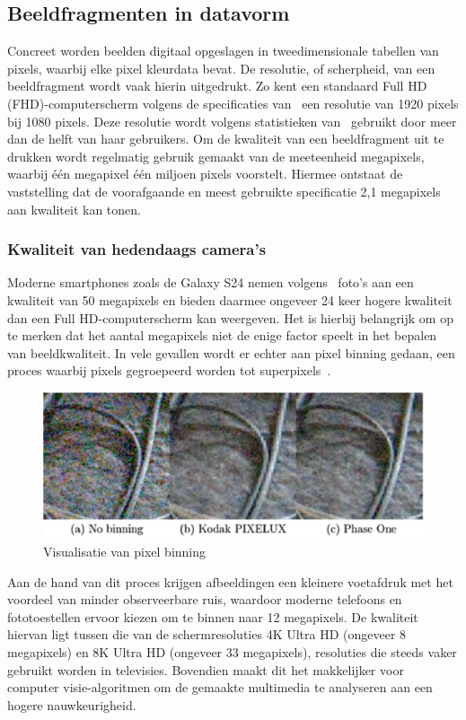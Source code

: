 \subsection{Beeldfragmenten in datavorm}\label{subsec:beeldfragmenten-als-data}
Concreet worden beelden digitaal opgeslagen in tweedimensionale tabellen van pixels, waarbij elke pixel kleurdata bevat.
De resolutie, of scherpheid, van een beeldfragment wordt vaak hierin uitgedrukt.
Zo kent een standaard Full HD (FHD)-computerscherm volgens de specificaties van~\textcite{VESA2013} een resolutie van 1920 pixels bij 1080 pixels.
Deze resolutie wordt volgens statistieken van~\textcite{ValveCorporation2024} gebruikt door meer dan de helft van haar gebruikers.
Om de kwaliteit van een beeldfragment uit te drukken wordt regelmatig gebruik gemaakt van de meeteenheid megapixels, waarbij \'e\'en megapixel \'e\'en miljoen pixels voorstelt.
Hiermee ontstaat de vaststelling dat de voorafgaande en meest gebruikte specificatie 2,1 megapixels aan kwaliteit kan tonen.

\subsubsection{Kwaliteit van hedendaags camera's}
Moderne smartphones zoals de Galaxy S24 nemen volgens~\textcite{Samsung2024} foto's aan een kwaliteit van 50 megapixels en bieden daarmee ongeveer 24 keer hogere kwaliteit dan een Full HD-computerscherm kan weergeven.
Het is hierbij belangrijk om op te merken dat het aantal megapixels niet de enige factor speelt in het bepalen van beeldkwaliteit.
In vele gevallen wordt er echter aan pixel binning gedaan, een proces waarbij pixels gegroepeerd worden tot superpixels~\autocite{Jin2012}.
\begin{figure}
    \includegraphics[width=1\linewidth]{images/pixel-binning}
    \caption{Visualisatie van pixel binning~\autocite{Jin2012}}
    \label{fig:pixel-binning}
\end{figure}
Aan de hand van dit proces krijgen afbeeldingen een kleinere voetafdruk met het voordeel van minder observeerbare ruis, waardoor moderne telefoons en fototoestellen ervoor kiezen om te binnen naar 12 megapixels.
De kwaliteit hiervan ligt tussen die van de schermresoluties 4K Ultra HD (ongeveer 8 megapixels) en 8K Ultra HD (ongeveer 33 megapixels), resoluties die steeds vaker gebruikt worden in televisies. \autocite{Statista2024}
Bovendien maakt dit het makkelijker voor computer visie-algoritmen om de gemaakte multimedia te analyseren aan een hogere nauwkeurigheid.

